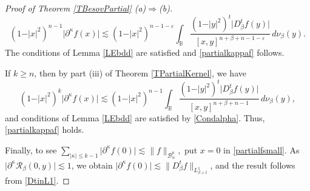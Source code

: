\documentclass{amsart}
\theoremstyle{definition}
\theoremstyle{remark}
\begin{document}
\begin{proof}[Proof of Theorem \ref{TBesovPartial} (a)$\Rightarrow$(b)]
\begin{equation*}
(1-\vert x\vert^2)^{n-1}\vert\partial^\kappa f(x)\vert
\lesssim (1-\vert x\vert^2)^{n-1-\varepsilon}\int_{\mathbb B}
\frac{(1-\vert y\vert^2)^t \vert D^t_\beta f(y)\vert}{[x,y]^{n+\beta+n-1-\varepsilon}}
\,d\nu_\beta(y).
\end{equation*}
The conditions of Lemma \ref{LEbdd} are satisfied and \eqref{partialkappaf} follows.

If $k\ge n$, then by part (iii) of Theorem \ref{TPartialKernel}, we have
\begin{equation*}
(1-\vert x\vert^2)^k\vert\partial^\kappa f(x)\vert
\lesssim (1-\vert x\vert^2)^{n-1}\int_{\mathbb B}
\frac{(1-\vert y\vert^2)^t \vert D^t_\beta f(y)\vert}{[x,y]^{n+\beta+n-1}}
\,d\nu_\beta(y),
\end{equation*}
and conditions of Lemma \ref{LEbdd} are satisfied by \eqref{Condalpha}.
Thus, \eqref{partialkappaf} holds.

Finally, to see
$\sum_{\vert\kappa\vert\le k-1}\vert\partial^\kappa f(0)\vert
\lesssim \|f\|_{\mathcal B^p_\alpha},$
put $x=0$ in \eqref{partialfsmall}.
As $\vert\partial^\kappa\mathcal R_\beta(0,y)\vert\lesssim 1$,
we obtain
$\vert\partial^\kappa f(0)\vert\lesssim \|D^t_\beta f\|_{L^1_{\beta+t}}$,
and the result follows from \eqref{DtinL1}.
\end{proof}
\end{document}
